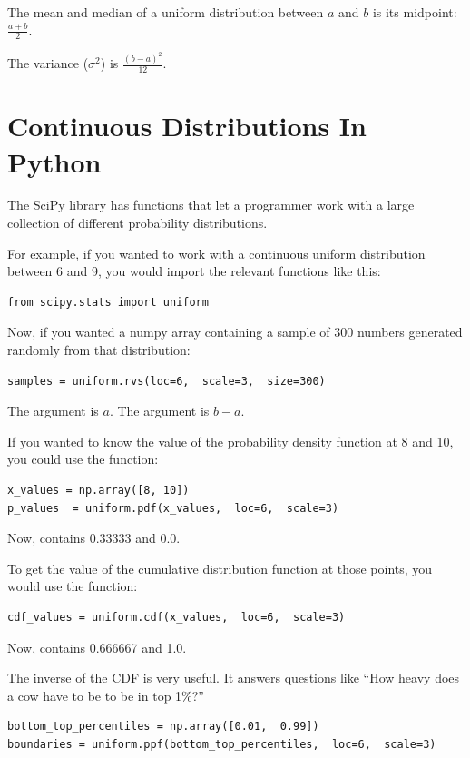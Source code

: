 The mean and median of a uniform distribution between $a$ and $b$ is its midpoint:  $\frac{a+b}{2}$.

The variance ($\sigma^2$) is $\frac{(b -a)^2}{12}$.

\section{Continuous Distributions In Python}

The SciPy library has functions that let a programmer work with a large collection of different probability distributions.

For example,  if you wanted to work with a continuous uniform distribution between 6 and 9,  you would import the relevant
functions like this:

\begin{verbatim}
from scipy.stats import uniform
\end{verbatim}

Now, if you wanted a numpy array containing a sample of 300 numbers generated randomly from that distribution:

\begin{verbatim}
samples = uniform.rvs(loc=6,  scale=3,  size=300)
\end{verbatim}

The  argument is $a$.  The  argument is $b - a$.

If you wanted to know the value of the probability density function at 8 and 10, you could use the  function:

\begin{verbatim}
x_values = np.array([8, 10])
p_values  = uniform.pdf(x_values,  loc=6,  scale=3)
\end{verbatim}

Now,  contains 0.33333 and 0.0.

To get the value of the cumulative distribution function at those points,  you would use the  function:

\begin{verbatim}
cdf_values = uniform.cdf(x_values,  loc=6,  scale=3)
\end{verbatim}

Now,  contains 0.666667 and 1.0.

The inverse of the CDF is very useful.   It answers questions like ``How heavy does a cow have to be to be in top 1\%?''

\begin{verbatim}
bottom_top_percentiles = np.array([0.01,  0.99])
boundaries = uniform.ppf(bottom_top_percentiles,  loc=6,  scale=3)
\end{verbatim}

